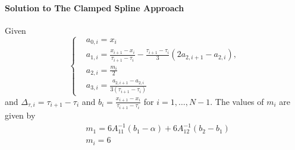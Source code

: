 \documentclass[article,moreauthors,pdftex,10pt,a4paper]{ssrn}
\begin{document}
\paragraph{Solution to The Clamped Spline Approach }
Given 
\begin{equation*}
\begin{cases}
& a_{0,i} = x_i \\
& a_{1,i} = \frac{x_{i+1} - x_i}{\tau_{i+1} - \tau_i} - \frac{\tau_{i+1} - \tau_i}{3} (2a_{2,i+1} - a_{2,i}), \\
&a_{2,i} = \frac{m_i}{2} \\
& a_{3,i} = \frac{a_{2,i+1} - a_{2,i}}{3(\tau_{i+1} - \tau_i)}
\end{cases}
\end{equation*}
and $\Delta_{\tau,i} = \tau_{i+1} - \tau_i$ and $b_i =  \frac{x_{i+1}- x_i}{\tau_{i+1} - \tau_i}$ for $i = 1, \ldots, N-1$. The values of $m_i$ are given by 
\begin{align}
& m_1 = 6A_{11}^{-1} (b_1 - \alpha) +  6A_{12}^{-1} (b_2 -b_1) \\
& m_i = 6
\end{align}
\end{document}
